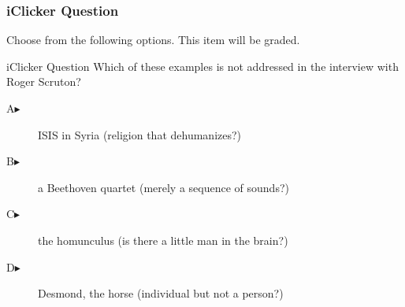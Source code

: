 \begin{frame}
  \frametitle{iClicker Question}
Choose from the following options. This item will be graded.
\begin{block}{iClicker Question}
Which of these examples is not addressed in the interview with Roger Scruton?
\end{block}
\begin{description}
\item[A\hspace{.2in}$\blacktriangleright$] ISIS in Syria (religion that dehumanizes?)
\item[B\hspace{.2in}$\blacktriangleright$] a Beethoven quartet (merely a sequence of sounds?)
\item[C\hspace{.2in}$\blacktriangleright$] the homunculus (is there a little man in the brain?)
\item[D\hspace{.2in}$\blacktriangleright$] Desmond, the horse (individual but not a person?)
\end{description}
\end{frame}
